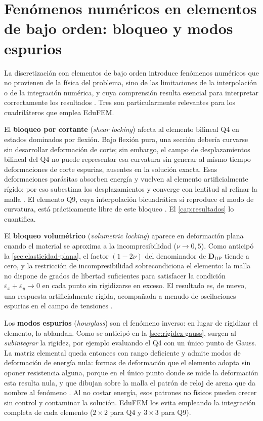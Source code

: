 \section{Fenómenos numéricos en elementos de bajo orden: bloqueo y modos espurios}
\label{sec:locking}

La discretización con elementos de bajo orden introduce fenómenos numéricos que no provienen de la física del problema, sino de las limitaciones de la interpolación o de la integración numérica, y cuya comprensión resulta esencial para interpretar correctamente los resultados \autocite{cook2002concepts,hughes2000fem,bathe2014fem}. Tres son particularmente relevantes para los cuadriláteros que emplea EduFEM.

El \textbf{bloqueo por cortante} (\emph{shear locking}) afecta al elemento bilineal Q4 en estados dominados por flexión. Bajo flexión pura, una sección debería curvarse sin desarrollar deformación de corte; sin embargo, el campo de desplazamientos bilineal del Q4 no puede representar esa curvatura sin generar al mismo tiempo deformaciones de corte espurias, ausentes en la solución exacta. Esas deformaciones parásitas absorben energía y vuelven al elemento artificialmente rígido: por eso subestima los desplazamientos y converge con lentitud al refinar la malla \autocites[pp.~98-99]{cook2002concepts}[p.~243]{hughes2000fem}. El elemento Q9, cuya interpolación bicuadrática sí reproduce el modo de curvatura, está prácticamente libre de este bloqueo \autocites[pp.~235-236]{cook2002concepts}[p.~243]{hughes2000fem}. El \autoref{cap:resultados} lo cuantifica.

El \textbf{bloqueo volumétrico} (\emph{volumetric locking}) aparece en deformación plana cuando el material se aproxima a la incompresibilidad ($\nu \to 0{,}5$). Como anticipó la \autoref{sec:elasticidad-plana}, el factor $(1-2\nu)$ del denominador de $\bm{D}_{\text{DP}}$ tiende a cero, y la restricción de incompresibilidad sobrecondiciona el elemento: la malla no dispone de grados de libertad suficientes para satisfacer la condición $\varepsilon_x + \varepsilon_y \to 0$ en cada punto sin rigidizarse en exceso. El resultado es, de nuevo, una respuesta artificialmente rígida, acompañada a menudo de oscilaciones espurias en el campo de tensiones \autocites[pp.~192, 208]{hughes2000fem}[pp.~282-283]{bathe2014fem}.

Los \textbf{modos espurios} (\emph{hourglass}) son el fenómeno inverso: en lugar de rigidizar el elemento, lo ablandan. Como se anticipó en la \autoref{sec:rigidez-gauss}, surgen al \emph{subintegrar} la rigidez, por ejemplo evaluando el Q4 con un único punto de Gauss. La matriz elemental queda entonces con rango deficiente y admite modos de deformación de energía nula: formas de deformación que el elemento adopta sin oponer resistencia alguna, porque en el único punto donde se mide la deformación esta resulta nula, y que dibujan sobre la malla el patrón de reloj de arena que da nombre al fenómeno \autocites[pp.~223-224]{cook2002concepts}[pp.~472-473]{bathe2014fem}. Al no costar energía, esos patrones no físicos pueden crecer sin control y contaminar la solución. EduFEM los evita empleando la integración completa de cada elemento ($2\times2$ para Q4 y $3\times3$ para Q9).

